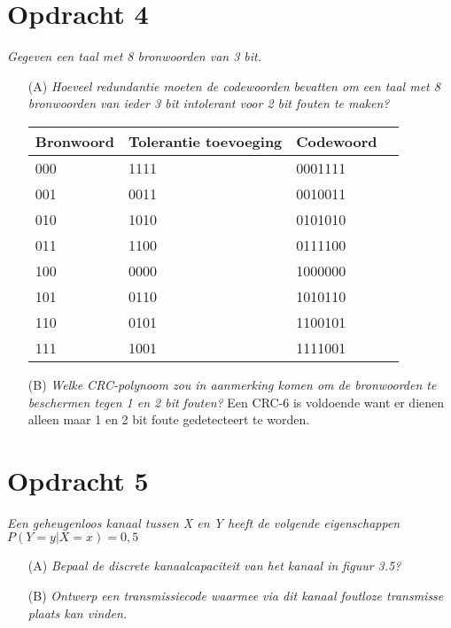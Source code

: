 \section{Opdracht 4}
\emph{Gegeven een taal met 8 bronwoorden van 3 bit.}

\begin{itemize}
\item[(A)] \emph{Hoeveel redundantie moeten de codewoorden bevatten om een taal met 8 bronwoorden van ieder 3 bit intolerant voor 2 bit fouten te maken?}

\begin{tabular}{|l|l|l|l|}
  \hline
  Bronwoord & Tolerantie toevoeging & Codewoord \\ \hline
  000 & 1111 & 0001111 \\ \hline
  001 & 0011 & 0010011 \\ \hline
  010 & 1010 & 0101010 \\ \hline
  011 & 1100 & 0111100 \\ \hline
  100 & 0000 & 1000000 \\ \hline
  101 & 0110 & 1010110 \\ \hline
  110 & 0101 & 1100101 \\ \hline
  111 & 1001 & 1111001 \\ \hline
\end{tabular}

\item[(B)] \emph{Welke CRC-polynoom zou in aanmerking komen om de bronwoorden te beschermen tegen 1 en 2 bit fouten?}
Een CRC-6 is voldoende want er dienen alleen maar 1 en 2 bit foute gedetecteert te worden.
\end{itemize}

\section{Opdracht 5}
\emph{Een geheugenloos kanaal tussen \emph{X} en \emph{Y} heeft de volgende eigenschappen $P(Y=y|X=x)=0,5$}
\begin{itemize}
  \item[(A)] \emph{Bepaal de discrete kanaalcapaciteit van het kanaal in figuur 3.5?}
  \item[(B)] \emph{Ontwerp een transmissiecode waarmee via dit kanaal foutloze transmisse plaats kan vinden.}
\end{itemize}
